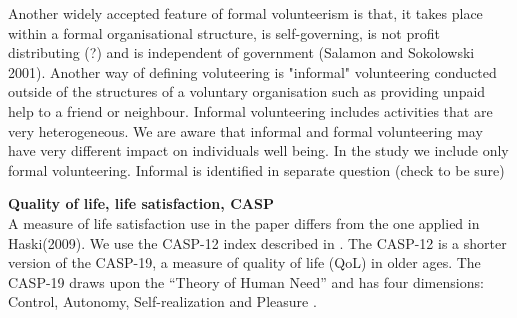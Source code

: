 \documentclass[10pt, letterpaper]{article}
\begin{document}
\begin{spacing}{1.4}
Another widely accepted feature of formal volunteerism is that, it takes place within a formal organisational structure, is self-governing, is not profit distributing (?) and is independent of government (Salamon and Sokolowski 2001). Another way of defining voluteering is "informal" volunteering conducted outside of the structures of a voluntary organisation such as providing unpaid help to a friend or neighbour. Informal volunteering includes activities that are very heterogeneous. We are aware that informal and formal volunteering may have very different impact on individuals well being. In the study we include only formal volunteering. Informal is identified in separate question (check to be sure)

\textbf{Quality of life, life satisfaction, CASP} \\
A measure of life satisfaction use in the paper differs from the one applied in Haski(2009). We use the CASP-12 index described in \cite{hyde03}. The CASP-12 is a shorter version of the CASP-19, a measure of quality of life (QoL) in older ages. The CASP-19 draws upon the “Theory of Human Need” and has four dimensions: Control, Autonomy, Self-realization and Pleasure \citep{borrat15}.\\


\end{spacing}
\end{document}
